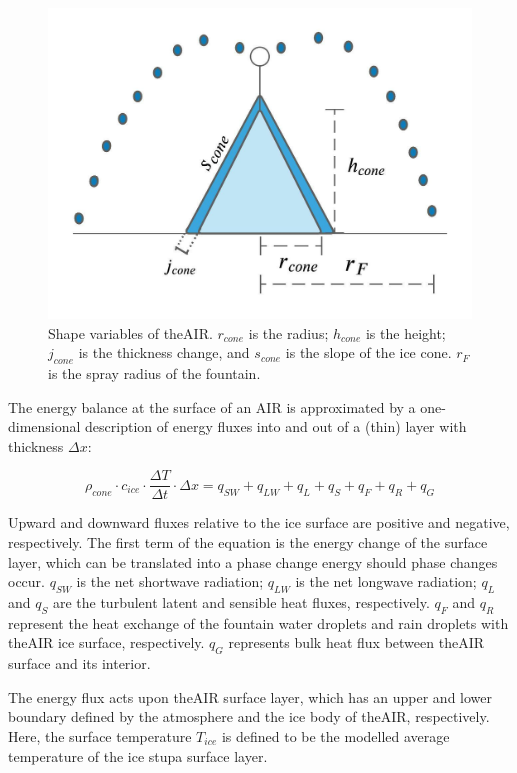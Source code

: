 \begin{figure}
	\begin{center}
		\includegraphics[width=10 cm]{figs/AIR_schematic.jpeg}
	\end{center}
	\caption{Shape variables of the\ac{AIR}. $r_{cone}$ is the radius; $h_{cone}$ is the height; $j_{cone}$ is the
		thickness change, and $s_{cone}$ is the slope of the ice cone. $r_F$ is the spray radius of the fountain.}
	\label{fig:shape}
\end{figure}

The energy balance at the surface of an \ac{AIR} is approximated by a one-dimensional description of energy fluxes
into and out of a (thin) layer with thickness $\Delta x$:

\begin{equation}
	\rho_{cone} \cdot c_{ice} \cdot \frac{\Delta T}{\Delta t} \cdot \Delta x = q_{SW} + q_{LW} + q_{L} + q_{S} + q_{F}+ q_{R} + q_{G}
	\label{eqn:EB}
\end{equation}

Upward and downward fluxes relative to the ice surface are positive and negative, respectively. The first term
of the equation is the energy change of the surface layer, which can be translated into a phase change energy should phase
changes occur. $q_{SW}$ is the net shortwave radiation; $q_{LW}$ is the net longwave radiation; $q_{L}$ and
$q_{S}$ are the turbulent latent and sensible heat fluxes, respectively. $q_{F}$ and $q_{R}$ represent the heat exchange of
the fountain water droplets and rain droplets with the\ac{AIR} ice surface, respectively. $q_{G}$ represents bulk
heat flux between the\ac{AIR} surface and its interior.

The energy flux acts upon the\ac{AIR} surface layer, which has an upper and lower boundary defined by the atmosphere
and the ice body of the\ac{AIR}, respectively. Here, the surface temperature $T_{ice}$ is defined to be the modelled
average temperature of the ice stupa surface layer.

